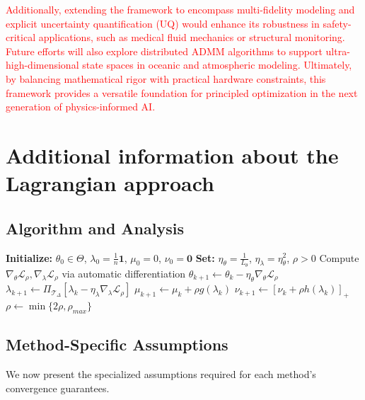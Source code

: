 \documentclass[preprint,12pt,authoryear]{elsarticle}
\begin{document}
\textcolor{red}{Additionally, extending the framework to encompass multi-fidelity modeling and explicit uncertainty quantification (UQ) would enhance its robustness in safety-critical applications, such as medical fluid mechanics or structural monitoring. Future efforts will also explore distributed ADMM algorithms to support ultra-high-dimensional state spaces in oceanic and atmospheric modeling. Ultimately, by balancing mathematical rigor with practical hardware constraints, this framework provides a versatile foundation for principled optimization in the next generation of physics-informed AI.}


\printbibliography



\appendix


\section{Additional information about the Lagrangian approach}


\subsection{Algorithm and Analysis}

\begin{algorithm}[H]
\caption{Two-Time-Scale Augmented Lagrangian Method}
\begin{algorithmic}[1]
\State \textbf{Initialize:} $\theta_0 \in \Theta$, $\lambda_0 = \frac{1}{n}\mathbf{1}$, $\mu_0 = 0$, $\nu_0 = \mathbf{0}$
\State \textbf{Set:} $\eta_\theta = \frac{1}{L_\theta}$, $\eta_\lambda = \eta_\theta^2$, $\rho > 0$
    \State Compute $\nabla_\theta \mathcal{L}_\rho, \nabla_\lambda \mathcal{L}_\rho$ via automatic differentiation
    \State $\theta_{k+1} \gets \theta_k - \eta_\theta \nabla_\theta \mathcal{L}_\rho$
    \State $\lambda_{k+1} \gets \Pi_{\mathcal{T}_\Delta}[\lambda_k - \eta_\lambda \nabla_\lambda \mathcal{L}_\rho]$
    \State $\mu_{k+1} \gets \mu_k + \rho g(\lambda_k)$
    \State $\nu_{k+1} \gets [\nu_k + \rho h(\lambda_k)]_+$
        \State $\rho \gets \min\{2\rho, \rho_{max}\}$
    \EndIf
\EndWhile
\end{algorithmic}
\end{algorithm}



\subsection{Method-Specific Assumptions}
\label{appendix:method_specific_assumptions}
We now present the specialized assumptions required for each method's convergence guarantees.
\end{document}
